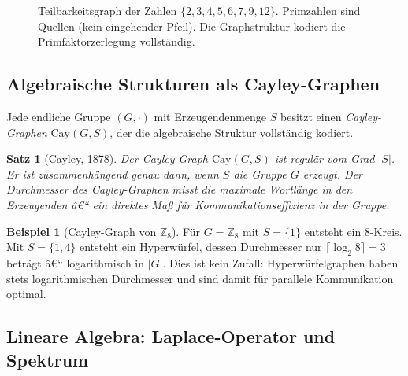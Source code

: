 ﻿\documentclass[12pt,a4paper,twoside]{article}
\theoremstyle{definition}
\newtheorem{beispiel}{Beispiel}[section]
\theoremstyle{plain}
\newtheorem{theorem}{Satz}[section]
\theoremstyle{remark}
\begin{document}
\begin{figure}[h]
  \centering
  \caption{Teilbarkeitsgraph der Zahlen $\{2,3,4,5,6,7,9,12\}$.
           Primzahlen sind Quellen (kein eingehender Pfeil).
           Die Graphstruktur kodiert die Primfaktorzerlegung
           vollständig.}
  \label{fig:divisibility}
\end{figure}

\subsection{Algebraische Strukturen als Cayley-Graphen}

Jede endliche Gruppe $(G, \cdot)$ mit Erzeugendenmenge $S$ besitzt
einen \emph{Cayley-Graphen} $\text{Cay}(G,S)$, der die algebraische
Struktur vollständig kodiert.

\begin{theorem}[Cayley, 1878]
Der Cayley-Graph $\text{Cay}(G,S)$ ist regulär vom Grad $|S|$.  Er
ist zusammenhängend genau dann, wenn $S$ die Gruppe $G$ erzeugt.
Der Durchmesser des Cayley-Graphen misst die maximale Wortlänge
in den Erzeugenden â€“ ein direktes Maß für
Kommunikationseffizienz in der Gruppe.
\end{theorem}

\begin{beispiel}[Cayley-Graph von $\mathbb{Z}_8$]
Für $G = \mathbb{Z}_8$ mit $S=\{1\}$ entsteht ein 8-Kreis.
Mit $S=\{1,4\}$ entsteht ein Hyperwürfel, dessen Durchmesser
nur $\lceil\log_2 8\rceil = 3$ beträgt â€“ logarithmisch in $|G|$.
Dies ist kein Zufall: Hyperwürfelgraphen haben stets logarithmischen
Durchmesser und sind damit für parallele Kommunikation optimal.
\end{beispiel}

\subsection{Lineare Algebra: Laplace-Operator und Spektrum}
\end{document}
